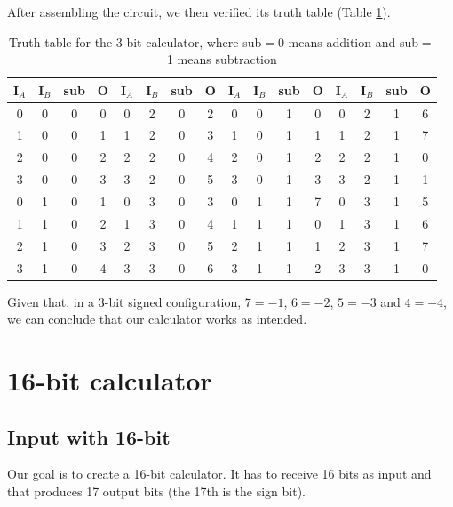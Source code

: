 \documentclass{article}
\begin{document}
After assembling the circuit, we then verified its truth table (Table \ref{Table_calculator}).

\begin{table}[h]
  \centering
  \begin{tabular}{| c | c | c | c ||| c | c | c | c ||| c | c | c | c ||| c | c | c | c |}
  \hline
  I$_A$ & I$_B$ & sub & O & I$_A$ & I$_B$ & sub & O & I$_A$ & I$_B$ & sub & O & I$_A$ & I$_B$ & sub & O \\ \hline
  0 & 0 & 0 & 0 & 0 & 2 & 0 & 2 & 0 & 0 & 1 & 0 & 0 & 2 & 1 & 6 \\ \hline
  1 & 0 & 0 & 1 & 1 & 2 & 0 & 3 & 1 & 0 & 1 & 1 & 1 & 2 & 1 & 7 \\ \hline
  2 & 0 & 0 & 2 & 2 & 2 & 0 & 4 & 2 & 0 & 1 & 2 & 2 & 2 & 1 & 0 \\ \hline
  3 & 0 & 0 & 3 & 3 & 2 & 0 & 5 & 3 & 0 & 1 & 3 & 3 & 2 & 1 & 1 \\ \hline
  0 & 1 & 0 & 1 & 0 & 3 & 0 & 3 & 0 & 1 & 1 & 7 & 0 & 3 & 1 & 5 \\ \hline
  1 & 1 & 0 & 2 & 1 & 3 & 0 & 4 & 1 & 1 & 1 & 0 & 1 & 3 & 1 & 6 \\ \hline
  2 & 1 & 0 & 3 & 2 & 3 & 0 & 5 & 2 & 1 & 1 & 1 & 2 & 3 & 1 & 7 \\ \hline
  3 & 1 & 0 & 4 & 3 & 3 & 0 & 6 & 3 & 1 & 1 & 2 & 3 & 3 & 1 & 0 \\ \hline
  \end{tabular}
  \caption{Truth table for the 3-bit calculator, where sub$=$0 means addition and sub$=$1 means subtraction}
  \label{Table_calculator}
\end{table}

Given that, in a 3-bit signed configuration, $7=-1$, $6=-2$, $5=-3$ and $4=-4$, we can conclude that our calculator works as intended.

\clearpage





\clearpage

\section{16-bit calculator} \label{SimulatedCalculator}



\subsection{Input with 16-bit}

Our goal is to create a 16-bit calculator. It has to receive 16 bits as input and that produces 17 output bits (the 17th is the sign bit).
\end{document}
